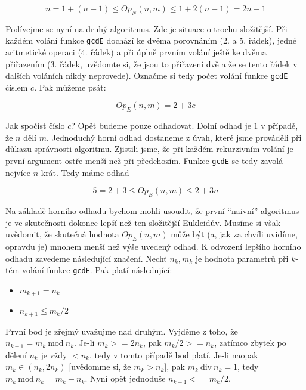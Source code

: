 \begin{displaymath}
 n = 1 + (n-1) \leq Op_N(n,m) \leq 1 + 2(n-1) = 2n - 1
\end{displaymath}


Podívejme se nyní na druhý algoritmus. Zde je situace o trochu složitější. Při každém volání funkce {\tt gcdE} dochází ke 
dvěma porovnáním (2. a 5. řádek), jedné aritmetické operaci (4. řádek) a při úplně prvním volání ještě ke dvěma přiřazením 
(3. řádek, uvědomte si, že jsou to přiřazení dvě a že se tento řádek v dalších
voláních nikdy neprovede). Označme si tedy počet volání funkce {\tt gcdE} číslem $c$. Pak můžeme psát:

\begin{displaymath}
Op_E(n,m) = 2 + 3c
\end{displaymath}

Jak spočíst číslo $c$? Opět budeme pouze odhadovat. Dolní odhad je $1$ v případě, že $n$ dělí $m$. Jednoduchý horní odhad dostaneme
z úvah, které jsme prováděli při důkazu správnosti algoritmu. Zjistili jsme, že při každém rekurzivním volání je první argument ostře 
menší než při předchozím. Funkce {\tt gcdE} se tedy zavolá nejvíce $n$-krát. Tedy máme odhad

\begin{displaymath}
 5 = 2+3\leq Op_E(n,m) \leq 2 + 3n
\end{displaymath}

Na základě horního odhadu bychom mohli usoudit, že první ``naivní'' algoritmus je ve skutečnosti dokonce lepší než ten složitější
Eukleidův. Musíme si však uvědomit, že skutečná hodnota $Op_E(n,m)$ může být (a, jak za chvíli
uvidíme, opravdu je) mnohem menší než výše uvedený odhad. K odvození lepšího horního odhadu zavedeme následující značení. Nechť
$n_k,m_k$ je hodnota parametrů při $k$-tém volání funkce {\tt gcdE}. Pak platí následující:

\begin{itemize}
 \item $m_{k+1}=n_k$
 \item $n_{k+1}\leq m_k/2$
\end{itemize}

První bod je zřejmý uvažujme nad druhým. Vyjděme z toho, že $n_{k+1} = m_k\ \mbox{mod}\ n_k$. Je-li $m_k>=2n_k$, pak $m_k/2>=n_k$, zatímco
zbytek po dělení $n_k$ je vždy $< n_k$, tedy v tomto případě bod platí. Je-li naopak $m_k \in (n_k, 2n_k)$ [uvědomme si, že $m_k > n_k]$, pak 
$m_k\ \mbox{div}\ n_k = 1$, tedy $m_k\ \mbox{mod}\ n_k = m_k-n_k$. Nyní opět jednoduše $n_{k+1} <= m_k/2$. 

